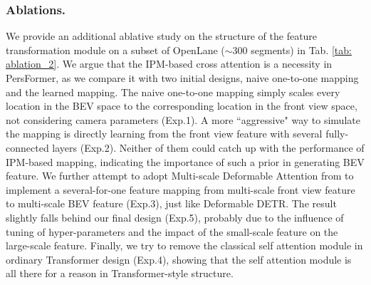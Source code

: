 \documentclass[runningheads]{llncs}
\begin{document}
\subsubsection{Ablations.}
We provide an additional ablative study on the structure of the feature transformation module on a subset of OpenLane ($\sim$300 segments) in Tab. \ref{tab: ablation_2}.
We argue that the IPM-based cross attention is a necessity in PersFormer, as we compare it with two initial designs, naive one-to-one mapping and the learned mapping.
The naive one-to-one mapping simply scales every location in the BEV space to the corresponding location in the front view space, not considering camera parameters (Exp.1).
A more ``aggressive" way to simulate the mapping is directly learning from the front view feature with several fully-connected layers (Exp.2).
Neither of them could catch up with the performance of IPM-based mapping, indicating the importance of such a prior in generating BEV feature.
We further attempt to adopt Multi-scale Deformable Attention from \cite{zhu2021deformable} to implement a several-for-one feature mapping from multi-scale front view feature to multi-scale BEV feature (Exp.3), just like Deformable DETR.
The result slightly falls behind our final design (Exp.5), probably due to the influence of tuning of hyper-parameters and the impact of the small-scale feature on the large-scale feature.
Finally, we try to remove the classical self attention module in ordinary Transformer design (Exp.4), showing that the self attention module is all there for a reason in Transformer-style structure.
\end{document}
